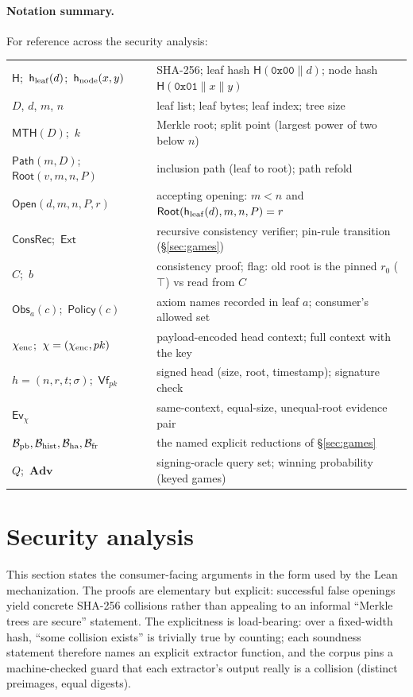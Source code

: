 \documentclass[11pt]{article}
\theoremstyle{remark}
\newcommand{\Hh}{\mathsf{H}}
\newcommand{\hleaf}{\mathsf{h}_{\rm leaf}}
\newcommand{\hnode}{\mathsf{h}_{\rm node}}
\newcommand{\MTH}{\mathsf{MTH}}
\newcommand{\Root}{\mathsf{Root}}
\newcommand{\Path}{\mathsf{Path}}
\newcommand{\ConsRec}{\mathsf{ConsRec}}
\newcommand{\Obs}{\mathsf{Obs}}
\newcommand{\Policy}{\mathsf{Policy}}
\begin{document}
\paragraph{Notation summary.}
For reference across the security analysis:

\begin{center}\small
\begin{tabular}{@{}ll@{}}
\toprule
$\Hh$;\ $\hleaf(d)$;\ $\hnode(x,y)$ & SHA-256; leaf hash $\Hh(\mathtt{0x00}\|d)$; node hash $\Hh(\mathtt{0x01}\|x\|y)$ \\
$D$, $d$, $m$, $n$ & leaf list; leaf bytes; leaf index; tree size \\
$\MTH(D)$;\ $k$ & Merkle root; split point (largest power of two below $n$) \\
$\Path(m,D)$;\ $\Root(v,m,n,P)$ & inclusion path (leaf to root); path refold \\
$\mathsf{Open}(d,m,n,P,r)$ & accepting opening: $m<n$ and $\Root(\hleaf(d),m,n,P)=r$ \\
$\ConsRec$;\ $\mathsf{Ext}$ & recursive consistency verifier; pin-rule transition (\S\ref{sec:games}) \\
$C$;\ $b$ & consistency proof; flag: old root is the pinned $r_0$ ($\top$) vs read from $C$ \\
$\Obs_a(c)$;\ $\Policy(c)$ & axiom names recorded in leaf $a$; consumer's allowed set \\
$\chi_{\rm enc}$;\ $\chi=(\chi_{\rm enc},pk)$ & payload-encoded head context; full context with the key \\
$h=(n,r,t;\sigma)$;\ $\mathsf{Vf}_{pk}$ & signed head (size, root, timestamp); signature check \\
$\mathsf{Ev}_\chi$ & same-context, equal-size, unequal-root evidence pair \\
$\mathcal{B}_{\rm pb},\mathcal{B}_{\rm hist},\mathcal{B}_{\rm ha},\mathcal{B}_{\rm fr}$ & the named explicit reductions of \S\ref{sec:games} \\
$Q$;\ $\mathbf{Adv}$ & signing-oracle query set; winning probability (keyed games) \\
\bottomrule
\end{tabular}
\end{center}

\section{Security analysis}\label{sec:security}

This section states the consumer-facing arguments in the form used by the Lean
mechanization. The proofs are elementary but explicit: successful false
openings yield concrete SHA-256 collisions rather than appealing to an informal
``Merkle trees are secure'' statement. The explicitness is load-bearing: over a
fixed-width hash, ``some collision exists'' is trivially true by counting;
each soundness statement therefore names an explicit extractor function,
and the corpus pins a machine-checked guard that each extractor's output
really is a collision (distinct preimages, equal digests).
\end{document}
